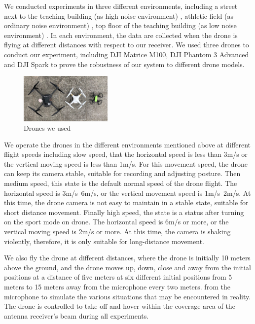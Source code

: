 \documentclass{sig-alternate-10pt}
\begin{document}
We conducted experiments in three different environments, including a street next to the teaching building (as high noise environment) , athletic field (as ordinary noise environment) , top floor of the teaching building (as low noise environment) . In each environment, the data are collected when the drone is flying at different distances with respect to our receiver. We used three drones to conduct our experiment, including DJI Matrice M100, DJI Phantom 3 Advanced and DJI Spark to prove the robustness of our system to different drone models. 



\begin{figure}[!h]
	\centering
	\includegraphics[width=0.4\textwidth]{pics/drones.png}
	\caption{Drones we used}
	\label{drones}
\end{figure}


\hspace{1mm} 
We operate the drones in the different environments mentioned above at different flight speeds including slow speed, that the horizontal speed is less than 3m/s or the vertical moving speed is less than 1m/s. For this movement speed, the drone can keep its camera stable, suitable for recording and adjusting posture. Then medium speed, this state is the default normal speed of the drone flight. The horizontal speed is 3m/s~6m/s, or the vertical movement speed is 1m/s~2m/s. At this time, the drone camera is not easy to maintain in a stable state, suitable for short distance movement. Finally high speed, the state is a status after turning on the sport mode on drone. The horizontal speed is 6m/s or more, or the vertical moving speed is 2m/s or more. At this time, the camera is shaking violently, therefore, it is only suitable for long-distance movement.

\hspace{1mm} 
We also fly the drone at different distances, where the drone is initially 10 meters above the ground, and the drone moves up, down, close and away from the initial positions at a distance of five meters at six different initial positions from 5 meters to 15 meters away from the microphone every two meters. from the microphone to simulate the various situations that may be encountered in reality. The drone is controlled to take off and hover within the coverage area of the antenna receiver’s beam during all experiments.
\end{document}
